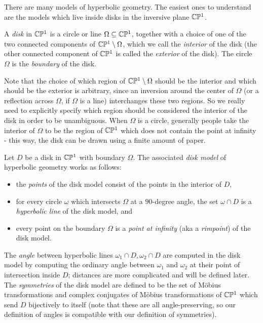 There are many models of hyperbolic geometry. The easiest ones to understand are the models which live inside disks in the inversive plane $\mathbb{C}\mathbb{P}^1$.

\begin{defn} A \emph{disk} in $\mathbb{C}\mathbb{P}^1$ is a circle or line $\Omega \subseteq \mathbb{C}\mathbb{P}^1$, together with a choice of one of the two connected components of $\mathbb{C}\mathbb{P}^1 \setminus \Omega$, which we call the \emph{interior} of the disk (the other connected component of $\mathbb{C}\mathbb{P}^1$ is called the \emph{exterior} of the disk). The circle $\Omega$ is the \emph{boundary} of the disk.
\end{defn}

Note that the choice of which region of $\mathbb{C}\mathbb{P}^1\setminus\Omega$ should be the interior and which should be the exterior is arbitrary, since an inversion around the center of $\Omega$ (or a reflection across $\Omega$, if $\Omega$ is a line) interchanges these two regions. So we really need to explicitly specify which region should be considered the interior of the disk in order to be unambiguous. When $\Omega$ is a circle, generally people take the interior of $\Omega$ to be the region of $\mathbb{C}\mathbb{P}^1$ which does not contain the point at infinity - this way, the disk can be drawn using a finite amount of paper.

\begin{defn} Let $D$ be a disk in $\mathbb{C}\mathbb{P}^1$ with boundary $\Omega$. The associated \emph{disk model} of hyperbolic geometry works as follows:
\begin{itemize}
\item the \emph{points} of the disk model consist of the points in the interior of $D$,
\item for every circle $\omega$ which intersects $\Omega$ at a $90$-degree angle, the set $\omega \cap D$ is a \emph{hyperbolic line} of the disk model, and
\item every point on the boundary $\Omega$ is a \emph{point at infinity} (aka a \emph{rimpoint}) of the disk model.
\end{itemize}
The \emph{angle} between hyperbolic lines $\omega_1\cap D, \omega_2\cap D$ are computed in the disk model by computing the ordinary angle between $\omega_1$ and $\omega_2$ at their point of intersection inside $D$; distances are more complicated and will be defined later. The \emph{symmetries} of the disk model are defined to be the set of M\"obius transformations and complex conjugates of M\"obius transformations of $\mathbb{C}\mathbb{P}^1$ which send $D$ bijectively to itself (note that these are all angle-preserving, so our definition of angles is compatible with our definition of symmetries).
\end{defn}

